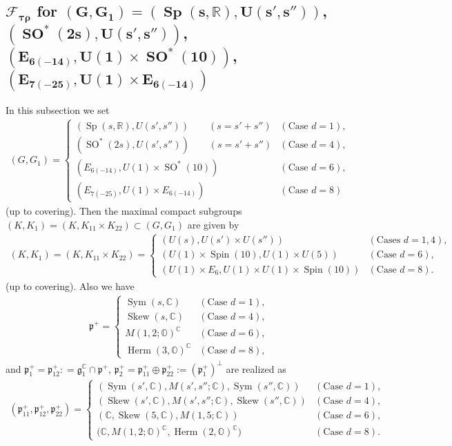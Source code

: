 \documentclass[pdftex]{sigma}
\numberwithin{equation}{section}
\newcommand{\BR}{\mathbb{R}}
\newcommand{\BC}{\mathbb{C}}
\newcommand{\BO}{\mathbb{O}}
\newcommand{\fg}{\mathfrak{g}}
\newcommand{\fp}{\mathfrak{p}}
\newcommand{\cF}{\mathcal{F}}
\newcommand{\Sym}{\operatorname{Sym}}
\newcommand{\Skew}{\operatorname{Skew}}
\newcommand{\Herm}{\operatorname{Herm}}
\begin{document}
\subsection[$\cF_{\tau\rho}$ for $(G,G_1)=(\operatorname{Sp}(s,\BR), U(s',s''))$, $(\operatorname{SO}^*(2s), U(s',s''))$, \\
$(E_{6(-14)}, U(1)\times \operatorname{SO}^*(10))$, $(E_{7(-25)}, U(1)\times E_{6(-14)})$]{$\boldsymbol{\cF_{\tau\rho}}$ for $\boldsymbol{(G,G_1)=(\operatorname{Sp}(s,\BR), U(s',s''))}$, $\boldsymbol{(\operatorname{SO}^*(2s), U(s',s''))}$, \\ $\boldsymbol{(E_{6(-14)}, U(1)\times \operatorname{SO}^*(10))}$, $\boldsymbol{(E_{7(-25)}, U(1)\times E_{6(-14)})}$}
In this subsection we set
\begin{gather*} (G,G_1)= \begin{cases}(\operatorname{Sp}(s,\BR), U(s',s'')) \qquad (s=s'+s'')& (\text{Case }d=1),\\
(\operatorname{SO}^*(2s), U(s',s'')) \qquad (s=s'+s'')& (\text{Case }d=4),\\
(E_{6(-14)}, U(1)\times \operatorname{SO}^*(10)) & (\text{Case }d=6),\\
(E_{7(-25)}, U(1)\times E_{6(-14)}) & (\text{Case }d=8) \end{cases} \end{gather*}
(up to covering). Then the maximal compact subgroups $(K,K_1)=(K,K_{11}\times K_{22})\subset (G,G_1)$ are given by
\begin{gather*}
(K,K_1) =(K,K_{11}\times K_{22})
 =\begin{cases} (U(s), U(s')\times U(s''))& (\text{Cases }d=1,4),\\
(U(1)\times \operatorname{Spin}(10), U(1)\times U(5))& (\text{Case }d=6),\\
(U(1)\times E_6,U(1)\times U(1)\times \operatorname{Spin}(10))& (\text{Case }d=8). \end{cases}
\end{gather*}
(up to covering). Also we have
\begin{gather*} \fp^+=\begin{cases}\Sym(s,\BC) & (\text{Case }d=1),\\ \Skew(s,\BC) & (\text{Case }d=4),\\
M(1,2;\BO)^\BC & (\text{Case }d=6),\\ \Herm(3,\BO)^\BC & (\text{Case }d=8), \end{cases} \end{gather*}
and $\fp^+_1=\fp^+_{12}\colon =\fg_1^\BC\cap\fp^+$, $\fp^+_2=\fp^+_{11}\oplus\fp^+_{22}:=(\fp^+_1)^\bot$ are realized as
\begin{gather*} (\fp^+_{11},\fp^+_{12},\fp^+_{22})=\begin{cases}
(\Sym(s',\BC), M(s',s'';\BC), \Sym(s'',\BC)) & (\text{Case }d=1),\\
(\Skew(s',\BC), M(s',s'';\BC), \Skew(s'',\BC)) & (\text{Case }d=4),\\
(\BC, \Skew(5,\BC), M(1,5;\BC)) & (\text{Case }d=6),\\
\big(\BC, M(1,2;\BO)^\BC, \Herm(2,\BO)^\BC\big) & (\text{Case }d=8). \end{cases} \end{gather*}
\end{document}

